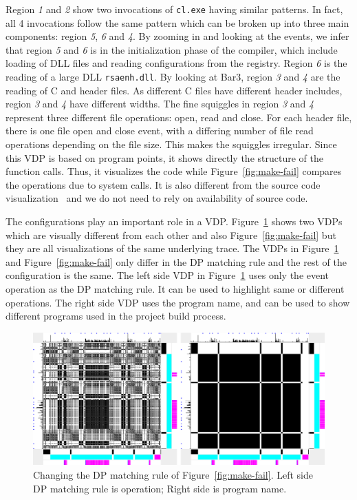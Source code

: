Region {\em 1} and {\em 2} show two invocations of {\tt cl.exe}
having similar patterns.
In fact, all 4 invocations follow the same pattern which can be broken
up into three main components:
region {\em 5}, {\em 6} and {\em 4}.
By zooming in and looking at the events, we infer that
region {\em 5} and {\em 6} is in the initialization phase of the compiler, which include
loading of DLL files and reading configurations from the registry.
Region {\em 6} is the reading of a large DLL {\tt rsaenh.dll}.
By looking at Bar3,
region {\em 3} and {\em 4} are the reading of C and header files.
As different C files have different header includes,
region {\em 3} and {\em 4} have different widths.
The fine squiggles in region {\em 3} and {\em 4} represent
three different file operations: open, read and close.
For each header file, there is one file open and close event,
with a differing number of file read operations depending
on the file size.
This makes the squiggles irregular.
Since this VDP is based on program points, it shows directly the 
structure of the function calls. Thus, it visualizes
the code while Figure~\ref{fig:make-fail} compares the operations
due to system calls.
It is also different from the source code
visualization~\cite{lefebvre2009tralfamadore} and we do not need to rely on
availability of source code.

The configurations play an important role in a VDP.
Figure~\ref{fig:make-matching} shows two VDPs
which are visually different from each other and also Figure~\ref{fig:make-fail}
but they are all visualizations of the same underlying trace.
The VDPs in Figure~\ref{fig:make-matching} and
Figure~\ref{fig:make-fail} only differ in the DP matching rule and
the rest of the configuration is the same.
The left side VDP in Figure~\ref{fig:make-matching} uses only the event
operation as the DP matching rule.
It can be used to highlight same or different operations.
The right side VDP uses the program name, and can be used to
show different programs used in the project build process.

\begin{figure}[htb]
\begin{center}
\includegraphics[width=1.0\columnwidth]{lviz/make-matching.png}
\caption{Changing the DP matching rule of Figure~\ref{fig:make-fail}.
Left side DP matching rule is operation; Right side is program name.
}
\label{fig:make-matching}
\end{center}
\end{figure}

